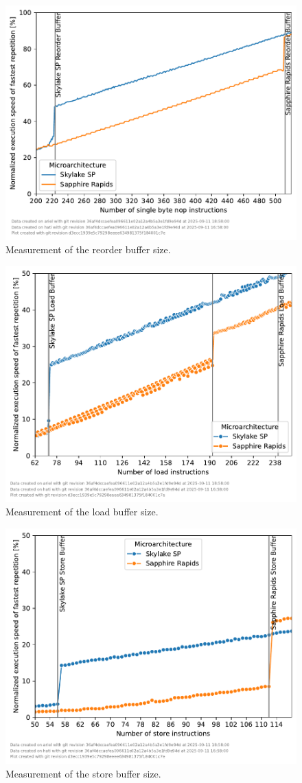 \begin{figure}[b]
    \centering
    \includegraphics[width=0.8\columnwidth]{fig/robsize/reorder-buffer.pdf}
    \caption{\label{fig:robsize-reorder}Measurement of the reorder buffer size.}
\end{figure}
\begin{figure}[]
    \centering
    \includegraphics[width=0.8\columnwidth]{fig/robsize/load-buffer.pdf}
    \caption{\label{fig:robsize-load}Measurement of the load buffer size.}
\end{figure}
\begin{figure}[]
    \centering
    \includegraphics[width=0.8\columnwidth]{fig/robsize/store-buffer.pdf}
    \caption{\label{fig:robsize-store}Measurement of the store buffer size.}
\end{figure}
